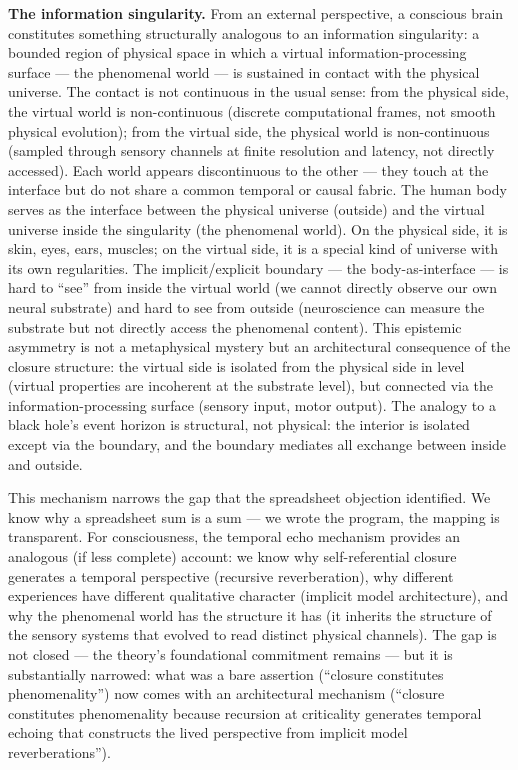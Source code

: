 \documentclass[12pt]{article}
\newcommand{\revend}{}
\begin{document}
{\textbf{The information singularity.} From an external perspective, a conscious brain constitutes something structurally analogous to an information singularity: a bounded region of physical space in which a virtual information-processing surface --- the phenomenal world --- is sustained in contact with the physical universe. The contact is not continuous in the usual sense: from the physical side, the virtual world is non-continuous (discrete computational frames, not smooth physical evolution); from the virtual side, the physical world is non-continuous (sampled through sensory channels at finite resolution and latency, not directly accessed). Each world appears discontinuous to the other --- they touch at the interface but do not share a common temporal or causal fabric. The human body serves as the interface between the physical universe (outside) and the virtual universe inside the singularity (the phenomenal world). On the physical side, it is skin, eyes, ears, muscles; on the virtual side, it is a special kind of universe with its own regularities. The implicit/explicit boundary --- the body-as-interface --- is hard to ``see'' from inside the virtual world (we cannot directly observe our own neural substrate) and hard to see from outside (neuroscience can measure the substrate but not directly access the phenomenal content). This epistemic asymmetry is not a metaphysical mystery but an architectural consequence of the closure structure: the virtual side is isolated from the physical side in level (virtual properties are incoherent at the substrate level), but connected via the information-processing surface (sensory input, motor output). The analogy to a black hole's event horizon is structural, not physical: the interior is isolated except via the boundary, and the boundary mediates all exchange between inside and outside.

This mechanism narrows the gap that the spreadsheet objection identified. We know why a spreadsheet sum is a sum --- we wrote the program, the mapping is transparent. For consciousness, the temporal echo mechanism provides an analogous (if less complete) account: we know why self-referential closure generates a temporal perspective (recursive reverberation), why different experiences have different qualitative character (implicit model architecture), and why the phenomenal world has the structure it has (it inherits the structure of the sensory systems that evolved to read distinct physical channels). The gap is not closed --- the theory's foundational commitment remains --- but it is substantially narrowed: what was a bare assertion (``closure constitutes phenomenality'') now comes with an architectural mechanism (``closure constitutes phenomenality because recursion at criticality generates temporal echoing that constructs the lived perspective from implicit model reverberations'').\revend}
\end{document}

